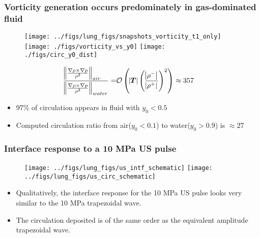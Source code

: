 \begin{frame} \frametitle{\vspace*{0.5cm}Vorticity generation occurs predominately in gas-dominated fluid}
  \vspace*{-.5cm}
  {\scriptsize
    \begin{figure}
      \centering
      \hfill
      \texttt{[image: ../figs/lung\_figs/snapshots\_vorticity\_t1\_only]} \hfill
      \texttt{[image: ./figs/vorticity\_vs\_y0]} \hfill
      \texttt{[image: ./figs/circ\_y0\_dist]}
      \hfill
    \end{figure}
    \vspace*{-.3cm}
    \begin{align*}%
      \frac{\norm{\frac{\nabla\rho\times\nabla p}{\rho^2}}_{air\quad}}{\norm{\frac{\nabla\rho\times\nabla p}{\rho^2}}_{water}}%
      =&\orderof{\abs{\boldsymbol{T}}\left(\frac{\abs{\rho^-}}{\abs{\rho^+}}\right)^2}%
         \approx 357
    \end{align*}
    \vspace*{-.25cm}
    \begin{itemize}
    \item 97\% of circulation appears in fluid with $y_0<0.5$
    \item Computed circulation ratio from air($y_0<0.1$) to water($y_0>0.9$) is $\approx 27$
    \end{itemize}
  }
\end{frame}
\begin{frame} \frametitle{\vspace*{0.5cm}Interface response to a 10 MPa US pulse}
  \begin{figure}
    \centering
    \texttt{[image: ../figs/lung\_figs/us\_intf\_schematic]}\hfill
    \texttt{[image: ../figs/lung\_figs/us\_circ\_schematic]}
  \end{figure}
  \begin{itemize}
  \item Qualitatively, the interface response for the 10 MPa US pulse looks very similar to the 10 MPa trapezoidal wave. 
  \item The circulation deposited is of the same order as the equivalent amplitude trapezoidal wave.
  \end{itemize}

\end{frame}
